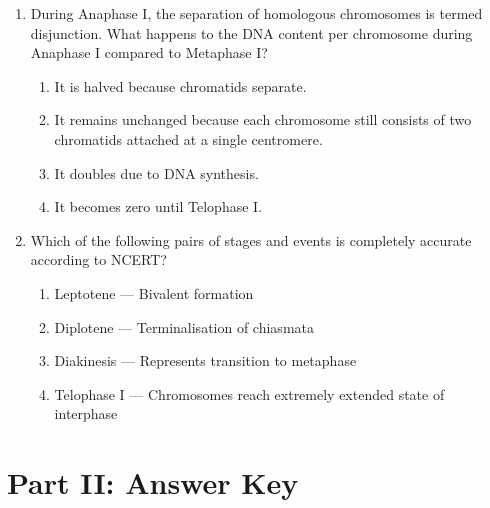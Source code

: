 \documentclass[11pt,a4paper]{article}
\begin{document}
\begin{enumerate}[label=\textbf{\arabic*.}]
\item During Anaphase I, the separation of homologous chromosomes is termed disjunction. What happens to the DNA content per chromosome during Anaphase I compared to Metaphase I?
\begin{enumerate}[label=(\Alph*)]
    \item It is halved because chromatids separate.
    \item It remains unchanged because each chromosome still consists of two chromatids attached at a single centromere.
    \item It doubles due to DNA synthesis.
    \item It becomes zero until Telophase I.
\end{enumerate}

\item Which of the following pairs of stages and events is completely accurate according to NCERT?
\begin{enumerate}[label=(\Alph*)]
    \item Leptotene — Bivalent formation
    \item Diplotene — Terminalisation of chiasmata
    \item Diakinesis — Represents transition to metaphase
    \item Telophase I — Chromosomes reach extremely extended state of interphase
\end{enumerate}

\end{enumerate}

\newpage
\section*{Part II: Answer Key}
\end{document}
